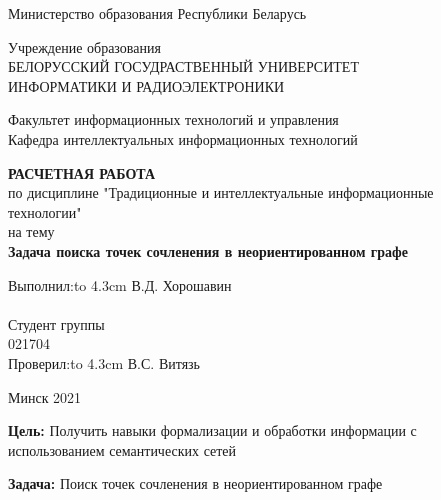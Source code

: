 \documentclass[a4paper]{article}
\begin{document}
\thispagestyle{empty}
\begin{center}
  Министерство образования Республики Беларусь \\
\end{center}


\begin{center}
  Учреждение образования\\
  БЕЛОРУССКИЙ ГОСУДРАСТВЕННЫЙ УНИВЕРСИТЕТ \\ ИНФОРМАТИКИ И РАДИОЭЛЕКТРОНИКИ
\end{center}

\begin{center}
  Факультет информационных технологий и управления \\
  Кафедра интеллектуальных информационных технологий
\end{center}

\vspace{6em}

\begin{center}
\textbf{РАСЧЕТНАЯ РАБОТА} \\ 
по дисциплине "Традиционные и интеллектуальные информационные \\ технологии" \\
на тему \\
\textbf{Задача поиска точек сочленения в неориентированном графе}
\end{center}

\vspace{15em}


\newbox{\lbox}
\newlength{\maxl}
\setlength{\maxl}{\wd\lbox}
\hfill\parbox{16.5cm}
{
\hspace*{5cm}\hspace*{-5cm}Выполнил:\hfill\hbox to 4.3cm {В.Д. Хорошавин\hfill}\\\\
\hspace*{5cm}\hspace*{-5cm}Студент группы \\ 021704\\
\hspace*{5cm}\hspace*{-5cm}Проверил:\hfill\hbox to 4.3cm {В.С. Витязь\hfill}\\
}


\vspace{\fill}

\begin{center}
Минск 2021
\end{center}
\newpage
\setcounter{page}{1}
\textbf{Цель:} Получить навыки формализации и обработки информации с использованием семантических сетей \par
\textbf{Задача:} Поиск точек сочленения в неориентированном графе
\end{document}
